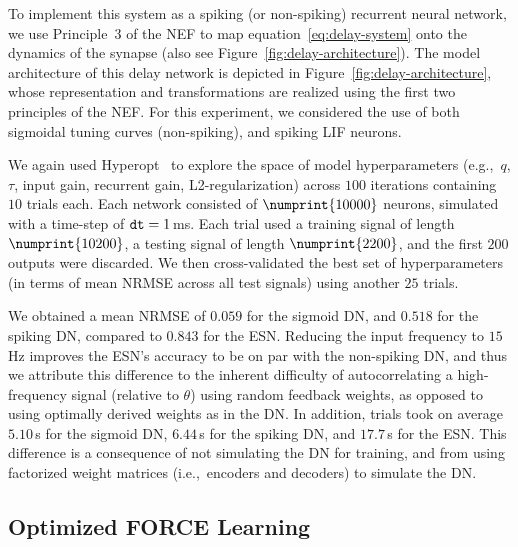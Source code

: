 To implement this system as a spiking (or non-spiking) recurrent neural network, we use Principle~3 of the NEF to map equation~\ref{eq:delay-system} onto the dynamics of the synapse (also see Figure~\ref{fig:delay-architecture}).
The model architecture of this delay network is depicted in Figure~\ref{fig:delay-architecture}, whose representation and transformations are realized using the first two principles of the NEF.
For this experiment, we considered the use of both sigmoidal tuning curves (non-spiking), and spiking LIF neurons.

We again used Hyperopt~\citep{bergstra2015hyperopt} to explore the space of model hyperparameters (e.g.,~$q$, $\tau$, input gain, recurrent gain, L2-regularization) across $100$ iterations containing $10$ trials each.
Each network consisted of $\numprint{10000}$ neurons, simulated with a time-step of $\texttt{dt}{} = 1$\,ms.
Each trial used a training signal of length $\numprint{10200}$, a testing signal of length $\numprint{2200}$, and the first $200$ outputs were discarded.
We then cross-validated the best set of hyperparameters (in terms of mean NRMSE across all test signals) using another $25$ trials.

We obtained a mean NRMSE of $0.059$ for the sigmoid DN, and $0.518$ for the spiking DN, compared to $0.843$ for the ESN.
Reducing the input frequency to $15$\,Hz improves the ESN's accuracy to be on par with the non-spiking DN, and thus we attribute this difference to the inherent difficulty of autocorrelating a high-frequency signal (relative to $\theta$) using random feedback weights, as opposed to using optimally derived weights as in the DN.
In addition, trials took on average $5.10$\,s for the sigmoid DN, $6.44$\,s for the spiking DN, and $17.7$\,s for the ESN.
This difference is a consequence of not simulating the DN for training, and from using factorized weight matrices (i.e.,~encoders and decoders) to simulate the DN.



\subsection{Optimized FORCE Learning}
\label{sec:force-comparison}

